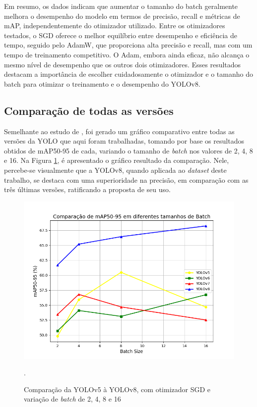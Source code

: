 Em resumo, os dados indicam que aumentar o tamanho do batch geralmente melhora o desempenho do modelo em termos de precisão, recall e métricas de mAP, independentemente do otimizador utilizado. Entre os otimizadores testados, o SGD oferece o melhor equilíbrio entre desempenho e eficiência de tempo, seguido pelo AdamW, que proporciona alta precisão e recall, mas com um tempo de treinamento competitivo. O Adam, embora ainda eficaz, não alcança o mesmo nível de desempenho que os outros dois otimizadores. Esses resultados destacam a importância de escolher cuidadosamente o otimizador e o tamanho do batch para otimizar o treinamento e o desempenho do YOLOv8.

\subsection{Comparação de todas as versões}

Semelhante ao estudo de \cite{ultralytics2023yolo}, foi gerado um gráfico comparativo entre todas as versões da YOLO que aqui foram trabalhadas, tomando por base os resultados obtidos de mAP50-95 de cada, variando o tamanho de \textit{batch} nos valores de 2, 4, 8 e 16. Na Figura \ref{fig:compara-todas-yolo}, é apresentado o gráfico resultado da comparação. Nele, percebe-se visualmente que a YOLOv8, quando aplicada ao \textit{dataset} deste trabalho, se destaca com uma superioridade na precisão, em comparação com as três últimas versões, ratificando a proposta de seu uso. 

\begin{figure}[!h]
    \centering
    \begin{minipage}{0.7\linewidth}
    \centering
    \captionsetup{justification=centering,margin=0.5cm,font=small}
    \includegraphics[width=1\linewidth]{img/cap6/comparacao-yolos-grafico.png}
    \caption{Comparação da YOLOv5 à YOLOv8, com otimizador SGD e variação de \textit{batch} de 2, 4, 8 e 16}.
    \label{fig:compara-todas-yolo}
    \end{minipage}
\end{figure}

